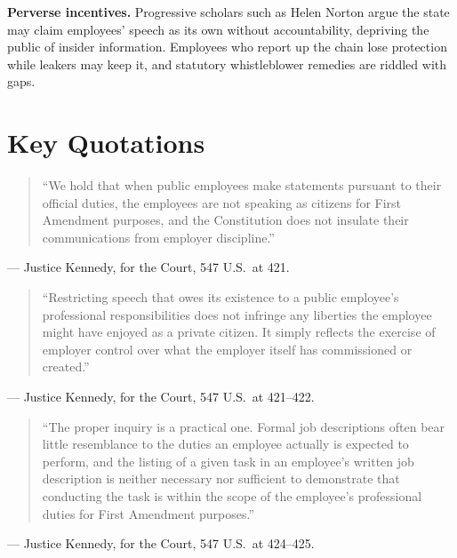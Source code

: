 \documentclass[12pt]{article}
\begin{document}
\textbf{Perverse incentives.} Progressive scholars such as Helen Norton argue the state may claim employees' speech as its own without accountability, depriving the public of insider information. Employees who report up the chain lose protection while leakers may keep it, and statutory whistleblower remedies are riddled with gaps.

\section{Key Quotations}

\begin{quote}
``We hold that when public employees make statements pursuant to their official duties, the employees are not speaking as citizens for First Amendment purposes, and the Constitution does not insulate their communications from employer discipline.''
\end{quote}
\noindent --- Justice Kennedy, for the Court, 547 U.S.\ at 421.

\begin{quote}
``Restricting speech that owes its existence to a public employee's professional responsibilities does not infringe any liberties the employee might have enjoyed as a private citizen. It simply reflects the exercise of employer control over what the employer itself has commissioned or created.''
\end{quote}
\noindent --- Justice Kennedy, for the Court, 547 U.S.\ at 421--422.

\begin{quote}
``The proper inquiry is a practical one. Formal job descriptions often bear little resemblance to the duties an employee actually is expected to perform, and the listing of a given task in an employee's written job description is neither necessary nor sufficient to demonstrate that conducting the task is within the scope of the employee's professional duties for First Amendment purposes.''
\end{quote}
\noindent --- Justice Kennedy, for the Court, 547 U.S.\ at 424--425.
\end{document}

